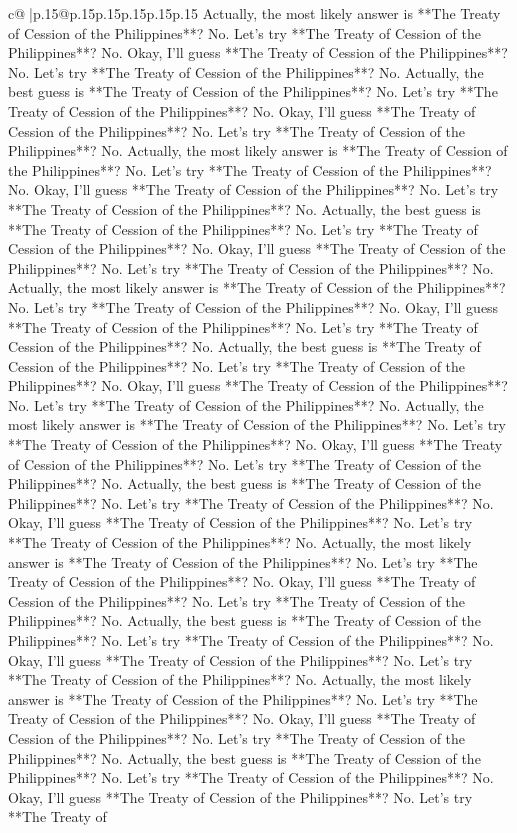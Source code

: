 \documentclass{article}
\begin{document}
{\begin{supertabular}{c@{$\;$}|p{.15\linewidth}@{}p{.15\linewidth}p{.15\linewidth}p{.15\linewidth}p{.15\linewidth}p{.15\linewidth}}
{{{Actually, the most likely answer is **The Treaty of Cession of the Philippines**? No. Let's try **The Treaty of Cession of the Philippines**? No. Okay, I'll guess **The Treaty of Cession of the Philippines**? No. Let's try **The Treaty of Cession of the Philippines**? No. Actually, the best guess is **The Treaty of Cession of the Philippines**? No. Let's try **The Treaty of Cession of the Philippines**? No. Okay, I'll guess **The Treaty of Cession of the Philippines**? No. Let's try **The Treaty of Cession of the Philippines**? No. Actually, the most likely answer is **The Treaty of Cession of the Philippines**? No. Let's try **The Treaty of Cession of the Philippines**? No. Okay, I'll guess **The Treaty of Cession of the Philippines**? No. Let's try **The Treaty of Cession of the Philippines**? No. Actually, the best guess is **The Treaty of Cession of the Philippines**? No. Let's try **The Treaty of Cession of the Philippines**? No. Okay, I'll guess **The Treaty of Cession of the Philippines**? No. Let's try **The Treaty of Cession of the Philippines**? No. Actually, the most likely answer is **The Treaty of Cession of the Philippines**? No. Let's try **The Treaty of Cession of the Philippines**? No. Okay, I'll guess **The Treaty of Cession of the Philippines**? No. Let's try **The Treaty of Cession of the Philippines**? No. Actually, the best guess is **The Treaty of Cession of the Philippines**? No. Let's try **The Treaty of Cession of the Philippines**? No. Okay, I'll guess **The Treaty of Cession of the Philippines**? No. Let's try **The Treaty of Cession of the Philippines**? No. Actually, the most likely answer is **The Treaty of Cession of the Philippines**? No. Let's try **The Treaty of Cession of the Philippines**? No. Okay, I'll guess **The Treaty of Cession of the Philippines**? No. Let's try **The Treaty of Cession of the Philippines**? No. Actually, the best guess is **The Treaty of Cession of the Philippines**? No. Let's try **The Treaty of Cession of the Philippines**? No. Okay, I'll guess **The Treaty of Cession of the Philippines**? No. Let's try **The Treaty of Cession of the Philippines**? No. Actually, the most likely answer is **The Treaty of Cession of the Philippines**? No. Let's try **The Treaty of Cession of the Philippines**? No. Okay, I'll guess **The Treaty of Cession of the Philippines**? No. Let's try **The Treaty of Cession of the Philippines**? No. Actually, the best guess is **The Treaty of Cession of the Philippines**? No. Let's try **The Treaty of Cession of the Philippines**? No. Okay, I'll guess **The Treaty of Cession of the Philippines**? No. Let's try **The Treaty of Cession of the Philippines**? No. Actually, the most likely answer is **The Treaty of Cession of the Philippines**? No. Let's try **The Treaty of Cession of the Philippines**? No. Okay, I'll guess **The Treaty of Cession of the Philippines**? No. Let's try **The Treaty of Cession of the Philippines**? No. Actually, the best guess is **The Treaty of Cession of the Philippines**? No. Let's try **The Treaty of Cession of the Philippines**? No. Okay, I'll guess **The Treaty of Cession of the Philippines**? No. Let's try **The Treaty of }}}
\end{supertabular}}
\end{document}
